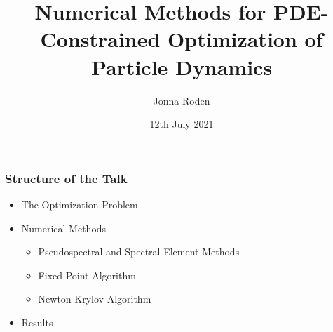 \documentclass[aspectratio=169,xcolor=dvipsnames]{beamer}
\begin{document}
\title[]{Numerical Methods for PDE-Constrained Optimization of Particle Dynamics}
\author[Jonna Roden]{Jonna Roden}
\date{12th July 2021}

\begin{frame}
\titlepage
\end{frame}
 
 
\begin{frame}
	\frametitle{Structure of the Talk}
	 
	 \begin{itemize}
	 	\item The Optimization Problem
	 	\item Numerical Methods\\
	 	\begin{itemize}
	 		\item Pseudospectral and Spectral Element Methods
	 		\item Fixed Point Algorithm
	 		\item Newton-Krylov Algorithm
	 	\end{itemize}
	 	\item Results
	 \end{itemize}
\end{frame}
\end{document}
